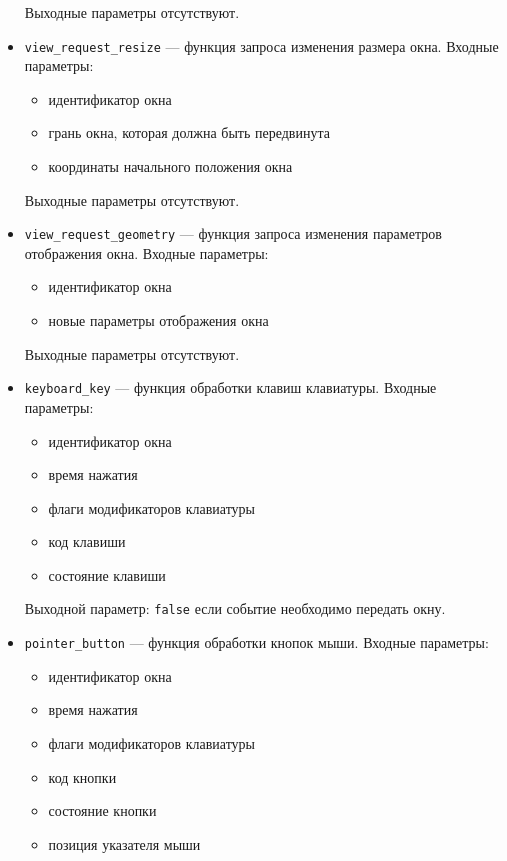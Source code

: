 \documentclass[10pt,a4paper]{report}
\begin{document}
\begin{itemize}
	Выходные параметры отсутствуют.
	
\item \texttt{view\_request\_resize} --- функция запроса изменения размера окна.  Входные параметры:
	\begin{itemize}
	\item идентификатор окна
	\item грань окна, которая должна быть передвинута
	\item координаты начального положения окна
	\end{itemize}
	
	Выходные параметры отсутствуют.
	
\item \texttt{view\_request\_geometry} --- функция запроса изменения параметров отображения окна.  Входные параметры:
	\begin{itemize}
	\item идентификатор окна
	\item новые параметры отображения окна
	\end{itemize}
	
	Выходные параметры отсутствуют.
	
\item \texttt{keyboard\_key} --- функция обработки клавиш клавиатуры.  Входные параметры:
	\begin{itemize}
	\item идентификатор окна
	\item время нажатия
	\item флаги модификаторов клавиатуры
	\item код клавиши
	\item состояние клавиши
	\end{itemize}
	
	Выходной параметр: \texttt{false} если событие необходимо передать окну.
	
\item \texttt{pointer\_button} --- функция обработки кнопок мыши.  Входные параметры:
	\begin{itemize}
	\item идентификатор окна
	\item время нажатия
	\item флаги модификаторов клавиатуры
	\item код кнопки
	\item состояние кнопки
	\item позиция указателя мыши
	\end{itemize}
	

\end{itemize}
\end{document}
